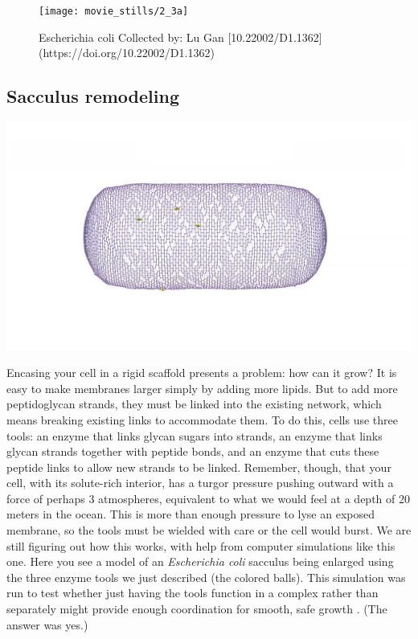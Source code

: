 \documentclass[]{tufte-book}
\begin{document}
\begin{figure}
\texttt{[image: movie\_stills/2\_3a]} \caption[Escherichia coli Collected by]{Escherichia coli Collected by: Lu Gan [10.22002/D1.1362](https://doi.org/10.22002/D1.1362)}\label{fig:unnamed-chunk-25}
\end{figure}

\subsection{Sacculus remodeling}\label{Sacculus_remodeling}

\includegraphics{img/schematics/2_3_2}

Encasing your cell in a rigid scaffold presents a problem: how can it
grow? It is easy to make membranes larger simply by adding more lipids.
But to add more peptidoglycan strands, they must be linked into the
existing network, which means breaking existing links to accommodate
them. To do this, cells use three tools: an enzyme that links glycan
sugars into strands, an enzyme that links glycan strands together with
peptide bonds, and an enzyme that cuts these peptide links to allow new
strands to be linked. Remember, though, that your cell, with its
solute-rich interior, has a turgor pressure pushing outward with a force
of perhaps 3 atmospheres, equivalent to what we would feel at a depth of
20 meters in the ocean. This is more than enough pressure to lyse an
exposed membrane, so the tools must be wielded with care or the cell
would burst. We are still figuring out how this works, with help from
computer simulations like this one. Here you see a model of an
\emph{Escherichia coli} sacculus being enlarged using the three enzyme
tools we just described (the colored balls). This simulation was run to
test whether just having the tools function in a complex rather than
separately might provide enough coordination for smooth, safe growth
\citet{nguyen2015}. (The answer was yes.)
\end{document}
